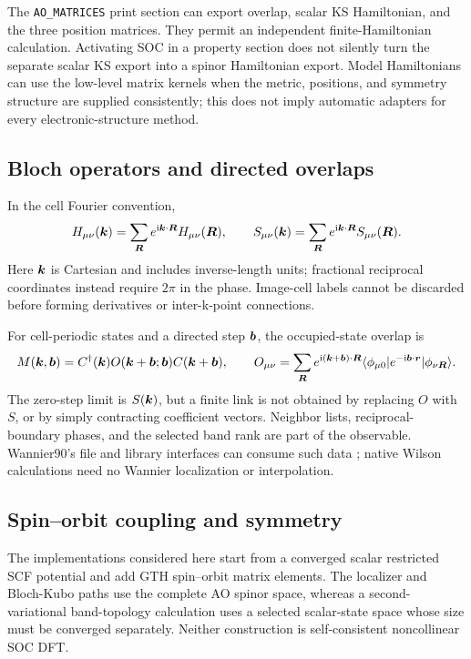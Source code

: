 The \texttt{AO\_MATRICES} print section can export overlap, scalar KS
Hamiltonian, and the three position matrices. They permit an independent
finite-Hamiltonian calculation. Activating SOC in a property section
does not silently turn the separate scalar KS export into a spinor
Hamiltonian export. Model Hamiltonians can use the low-level matrix
kernels when the metric, positions, and symmetry structure are supplied
consistently; this does not imply automatic adapters for every
electronic-structure method.

\subsection{Bloch operators and directed overlaps}
In the cell Fourier convention,
\begin{equation}
 H_{\mu\nu}(\bm{k})=\sum_{\bm{R}}e^{\mathrm{i}\bm{k}\cdot\bm{R}}H_{\mu\nu}(\bm{R}),
 \qquad
 S_{\mu\nu}(\bm{k})=\sum_{\bm{R}}e^{\mathrm{i}\bm{k}\cdot\bm{R}}S_{\mu\nu}(\bm{R}).
 \label{eq:bloch-matrices}
\end{equation}
Here $\bm{k}$ is Cartesian and includes inverse-length units; fractional
reciprocal coordinates instead require $2\pi$ in the phase.
Image-cell labels cannot be discarded before forming derivatives or
inter-k-point connections.

For cell-periodic states and a directed step $\bm{b}$, the occupied-state
overlap is
\begin{equation}
 M(\bm{k},\bm{b})=C^\dagger(\bm{k})O(\bm{k}+\bm{b};\bm{b})C(\bm{k}+\bm{b}),\qquad
 O_{\mu\nu}=\sum_{\bm{R}}e^{\mathrm{i}(\bm{k}+\bm{b})\cdot\bm{R}}
 \langle\phi_{\mu0}|e^{-\mathrm{i}\bm{b}\cdot\bm{r}}|\phi_{\nu\bm{R}}\rangle .
 \label{eq:wannier90-mmn-definition}
\end{equation}
The zero-step limit is $S(\bm{k})$, but a finite link is not obtained by
replacing $O$ with $S$, or by simply contracting coefficient vectors.
Neighbor lists, reciprocal-boundary phases, and the selected band rank
are part of the observable. Wannier90's file and library interfaces can
consume such data \cite{Pizzi2020}; native Wilson calculations need no
Wannier localization or interpolation.

\subsection{Spin--orbit coupling and symmetry}
The implementations considered here start from a converged scalar
restricted SCF potential and add GTH spin--orbit matrix elements.
The localizer and Bloch-Kubo paths use the complete AO spinor space,
whereas a second-variational band-topology calculation uses a selected
scalar-state space whose size must be converged separately.
Neither construction is self-consistent noncollinear SOC DFT.

